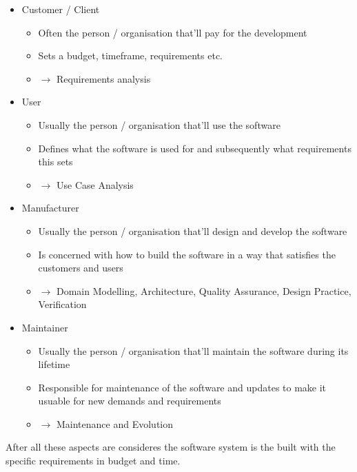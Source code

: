 \documentclass[
../../Software_Engineering_Summary.tex,
]
{subfiles}
\begin{document}
\begin{defbox*}
    \begin{itemize}
        \item Customer / Client
        \begin{itemize}
            \item Often the person / organisation that'll pay for the development
            \item Sets a budget, timeframe, requirements etc.
            \item $\rightarrow$ Requirements analysis
        \end{itemize}
        \item User
        \begin{itemize}
            \item Usually the person / organisation that'll use the software
            \item Defines what the software is used for and subsequently what requirements this sets
            \item $\rightarrow$ Use Case Analysis
        \end{itemize}
        \item Manufacturer
        \begin{itemize}
            \item Usually the person / organisation that'll design and develop the software
            \item Is concerned with how to build the software in a way that satisfies the customers and users
            \item $\rightarrow$ Domain Modelling, Architecture, Quality Assurance, Design Practice, Verification
        \end{itemize}
        \item Maintainer
        \begin{itemize}
            \item Usually the person / organisation that'll maintain the software during its lifetime
            \item Responsible for maintenance of the software and updates to make it usuable for new demands and requirements
            \item $\rightarrow$ Maintenance and Evolution
        \end{itemize}
    \end{itemize}
\end{defbox*}
After all these aspects are consideres the software system is the built with the specific requirements in budget and time.
\end{document}
